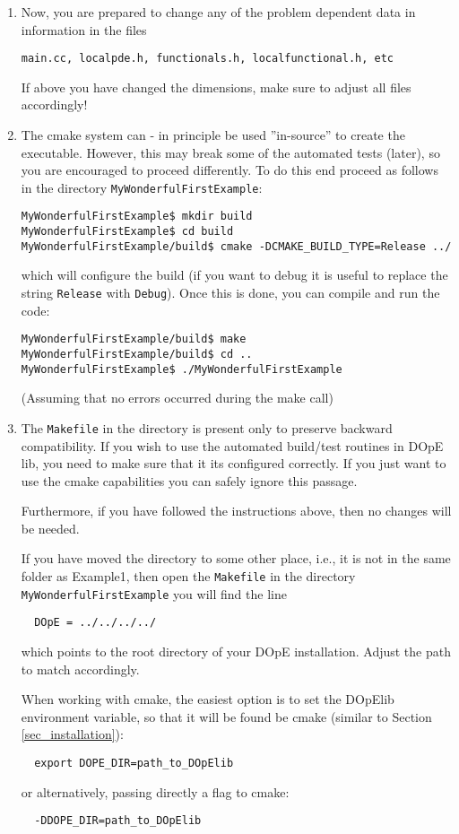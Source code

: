 \begin{enumerate}
\item  Now, you are prepared to change any of the problem
  dependent data in information in the files 
\begin{verbatim}
main.cc, localpde.h, functionals.h, localfunctional.h, etc
\end{verbatim} 
If above you have changed the dimensions, make sure to adjust all
files accordingly!

\item The cmake system can - in principle be used
  ''in-source'' to create the executable. 
  However, this may break some of the automated tests (later),
  so you are encouraged to proceed differently. To do this end
  proceed as follows in the directory \texttt{MyWonderfulFirstExample}:
  \begin{verbatim}
MyWonderfulFirstExample$ mkdir build
MyWonderfulFirstExample$ cd build
MyWonderfulFirstExample/build$ cmake -DCMAKE_BUILD_TYPE=Release ../
\end{verbatim}
which will configure the build (if you want to debug it is useful to
replace the string \texttt{Release} with \texttt{Debug}). 
Once this is done, you can compile and run the code:
\begin{verbatim}
MyWonderfulFirstExample/build$ make 
MyWonderfulFirstExample/build$ cd ..
MyWonderfulFirstExample$ ./MyWonderfulFirstExample
\end{verbatim}
(Assuming that no errors occurred during the make call)

\item The \texttt{Makefile} in the directory is present only to
  preserve backward compatibility. If you wish to use the automated
  build/test routines in DOpE lib, you need to make sure that it its
  configured correctly. If you just want to use the cmake capabilities 
  you can safely ignore this passage.

  Furthermore, if you have followed the instructions above, then no
  changes will be needed.

  If you have moved the directory to some other place, i.e., it is not
  in the same folder as Example1, then open the \texttt{Makefile} 
  in the directory \texttt{MyWonderfulFirstExample}
  you will find the line 
  \begin{verbatim}
  DOpE = ../../../../
  \end{verbatim}
  which points to the root directory of your DOpE installation.
  Adjust the path to match accordingly.

  When working with cmake, the easiest option is to set 
  the DOpElib environment variable, so that it will be found 
  be cmake (similar to Section \ref{sec_installation}):
  \begin{verbatim}
  export DOPE_DIR=path_to_DOpElib
  \end{verbatim}
  or alternatively, passing directly a flag to cmake:
  \begin{verbatim}
  -DDOPE_DIR=path_to_DOpElib
  \end{verbatim}


\end{enumerate}
